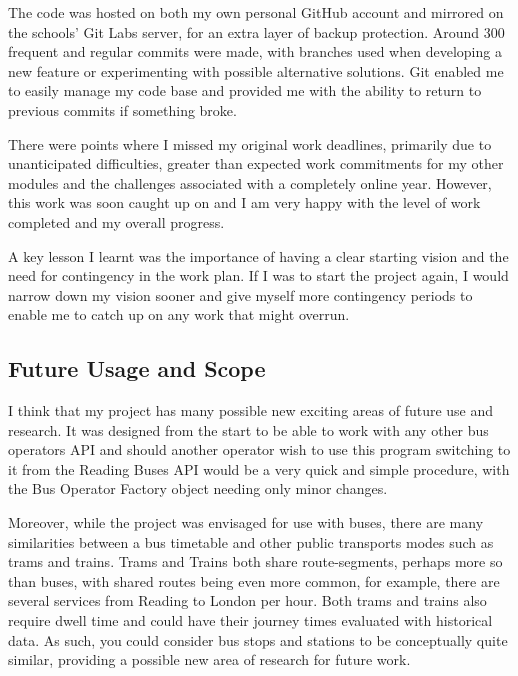 \documentclass{article}
\begin{document}
\par 
The code was hosted on both my own personal GitHub account and mirrored on the schools' Git Labs server, for an extra layer of backup protection. Around 300 frequent and regular commits were made, with branches used when developing a new feature or experimenting with possible alternative solutions. Git enabled me to easily manage my code base and provided me with the ability to return to previous commits if something broke.


\par 
There were points where I missed my original work deadlines, primarily due to unanticipated difficulties, greater than expected work commitments for my other modules and the challenges associated with a completely online year. However, this work was soon caught up on and I am very happy with the level of work completed and my overall progress.


\par
A key lesson I learnt was the importance of having a clear starting vision and the need for contingency in the work plan. If I was to start the project again, I would narrow down my vision sooner and give myself more contingency periods to enable me to catch up on any work that might overrun.


\subsection{Future Usage and Scope}
I think that my project has many possible new exciting areas of future use and research. It was designed from the start to be able to work with any other bus operators API and should another operator wish to use this program switching to it from the Reading Buses API would be a very quick and simple procedure, with the Bus Operator Factory object needing only minor changes. 


\par 
Moreover, while the project was envisaged for use with buses, there are many similarities between a bus timetable and other public transports modes such as trams and trains. Trams and Trains both share route-segments, perhaps more so than buses, with shared routes being even more common, for example, there are several services from Reading to London per hour. Both trams and trains also require dwell time and could have their journey times evaluated with historical data. As such, you could consider bus stops and stations to be conceptually quite similar, providing a possible new area of research for future work.
\end{document}
